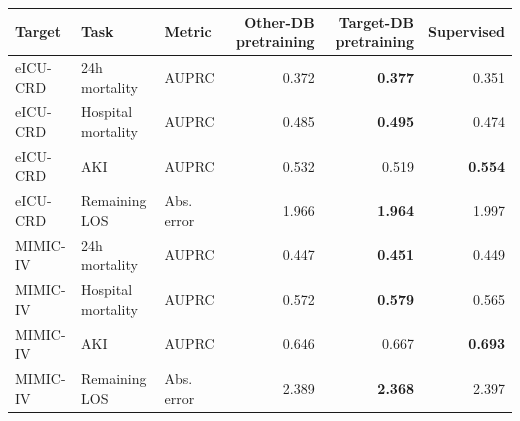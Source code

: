 \begin{tabular}{lllrrr}
\toprule
Target & Task & Metric & Other-DB pretraining & Target-DB pretraining & Supervised \\
\midrule
eICU-CRD & 24h mortality & AUPRC & 0.372 & \textbf{0.377} & 0.351 \\
eICU-CRD & Hospital mortality & AUPRC & 0.485 & \textbf{0.495} & 0.474 \\
eICU-CRD & AKI & AUPRC & 0.532 & 0.519 & \textbf{0.554} \\
eICU-CRD & Remaining LOS & Abs. error & 1.966 & \textbf{1.964} & 1.997 \\
MIMIC-IV & 24h mortality & AUPRC & 0.447 & \textbf{0.451} & 0.449 \\
MIMIC-IV & Hospital mortality & AUPRC & 0.572 & \textbf{0.579} & 0.565 \\
MIMIC-IV & AKI & AUPRC & 0.646 & 0.667 & \textbf{0.693} \\
MIMIC-IV & Remaining LOS & Abs. error & 2.389 & \textbf{2.368} & 2.397 \\
\bottomrule
\end{tabular}
